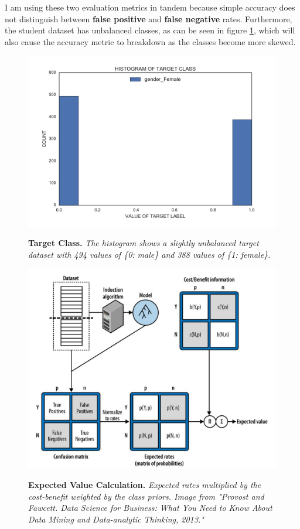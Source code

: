 I am using these two evaluation metrics in tandem because simple accuracy does not distinguish between \textbf{false positive} and \textbf{false negative} rates. Furthermore, the student dataset has unbalanced classes, as can be seen in figure \ref{targetClass}, which will also cause the accuracy metric to breakdown as the classes become more skewed.

\begin{figure}[!hbtp]
\centering

    \caption{\textbf{Target Class. }\textit{The histogram shows a slightly unbalanced target dataset with 494 values of \{0: male\} and 388 values of \{1: female\}.}}

    \includegraphics[width=1\textwidth]{figures/targetClass}
    \label{targetClass}
\end{figure}

\begin{figure}[!hbtp]
\centering

    \caption{\textbf{Expected Value Calculation. }\textit{Expected rates multiplied by the cost-benefit weighted by the class priors. Image from "Provost and Fawcett. Data Science for Business: What You Need to Know About Data Mining and Data-analytic Thinking, 2013."}}

    \includegraphics[width=1\textwidth]{figures/expectedValueCalculation.png}
    \label{expectedValue}
\end{figure}


